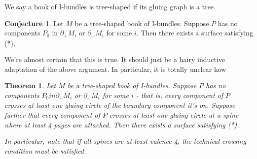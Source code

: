 \documentclass[12pt]{amsart}
\newtheorem{thm}[theorem]{Theorem}
\theoremstyle{definition}
\newtheorem{conj}[theorem]{Conjecture}
\newcommand{\bd}{\partial}
\begin{document}
We say a book of I-bundles is tree-shaped if its gluing graph is a tree.

\begin{conj}

Let $M$ be a tree-shaped book of I-bundles. Suppose $P$ has no
components $P_0$ in $\bd_+M_i$ or $\bd_-M_i$ for some $i$. Then there exists a surface
satisfying (*).

\end{conj}

We're almost certain that this is true. It should just be a hairy inductive
adaptation of the above argument. In particular, it is totally unclear how

\begin{thm}

Let $M$ be a tree-shaped book of I-bundles. Suppose $P$ has no components
$P_0 in \bd_+M_i$ or $\bd_-M_i$ for some $i$ - that is, every component of $P$ crosses at least
one gluing circle of the boundary component it's on. Suppose further that every
component of $P$ crosses at least one gluing circle at a spine where at least
4 pages are attached. Then there exists a surface satisfying (*).

In particular, note that if all spines are at least valence 4, the technical
crossing condition must be satisfied.

\end{thm}
\end{document}
